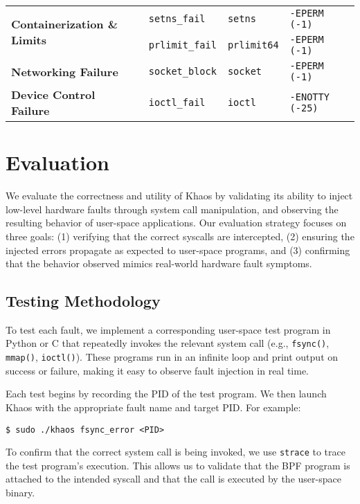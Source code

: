 \begin{table}[ht]
{\begin{tabular}{l|l|l|l}
\midrule
\multirow{2}{*}{\textbf{Containerization \& Limits}} 
    & \texttt{setns\_fail}         & \texttt{setns}        & \texttt{-EPERM (-1)} \\
    & \texttt{prlimit\_fail}       & \texttt{prlimit64}    & \texttt{-EPERM (-1)} \\
\midrule
\textbf{Networking Failure} 
    & \texttt{socket\_block}       & \texttt{socket}       & \texttt{-EPERM (-1)} \\
\midrule
\textbf{Device Control Failure} 
    & \texttt{ioctl\_fail}         & \texttt{ioctl}        & \texttt{-ENOTTY (-25)} \\
\bottomrule
\end{tabular}
}
\end{table}





\section{Evaluation}

We evaluate the correctness and utility of Khaos by validating its ability to inject low-level hardware faults through system call manipulation, and observing the resulting behavior of user-space applications. Our evaluation strategy focuses on three goals: (1) verifying that the correct syscalls are intercepted, (2) ensuring the injected errors propagate as expected to user-space programs, and (3) confirming that the behavior observed mimics real-world hardware fault symptoms.

\subsection{Testing Methodology}

To test each fault, we implement a corresponding user-space test program in Python or C that repeatedly invokes the relevant system call (e.g., \texttt{fsync()}, \texttt{mmap()}, \texttt{ioctl()}). These programs run in an infinite loop and print output on success or failure, making it easy to observe fault injection in real time.

Each test begins by recording the PID of the test program. We then launch Khaos with the appropriate fault name and target PID. For example:
\begin{verbatim}
$ sudo ./khaos fsync_error <PID>
\end{verbatim}

To confirm that the correct system call is being invoked, we use \texttt{strace} to trace the test program’s execution. This allows us to validate that the BPF program is attached to the intended syscall and that the call is executed by the user-space binary.

